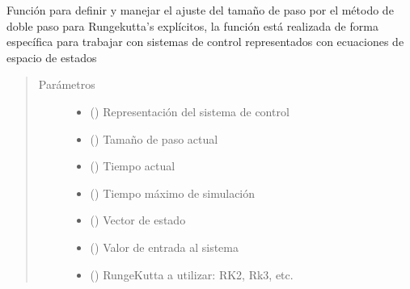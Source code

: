 \documentclass[letterpaper,10pt,spanish]{sphinxmanual}
\begin{document}
\begin{fulllineitems}
\label{\detokenize{codigos/rutinas_rk:rutinas_rk.rk_doble_paso_adaptativo}}
Función para definir y manejar el ajuste del tamaño de paso por el método de doble paso para Runge\sphinxhyphen{}kutta’s explícitos, la función está realizada de forma específica para trabajar con sistemas de control representados con ecuaciones de espacio de estados
\begin{quote}\begin{description}
\item[{Parámetros}] \leavevmode\begin{itemize}
\item {} 
 () \textendash{} Representación del sistema de control

\item {} 
 () \textendash{} Tamaño de paso actual

\item {} 
 () \textendash{} Tiempo actual

\item {} 
 () \textendash{} Tiempo máximo de simulación

\item {} 
 () \textendash{} Vector de estado

\item {} 
 () \textendash{} Valor de entrada al sistema

\item {} 
 () \textendash{} Runge\sphinxhyphen{}Kutta a utilizar: RK2, Rk3, etc.


\end{itemize}
\end{description}
\end{quote}
\end{fulllineitems}
\end{document}
